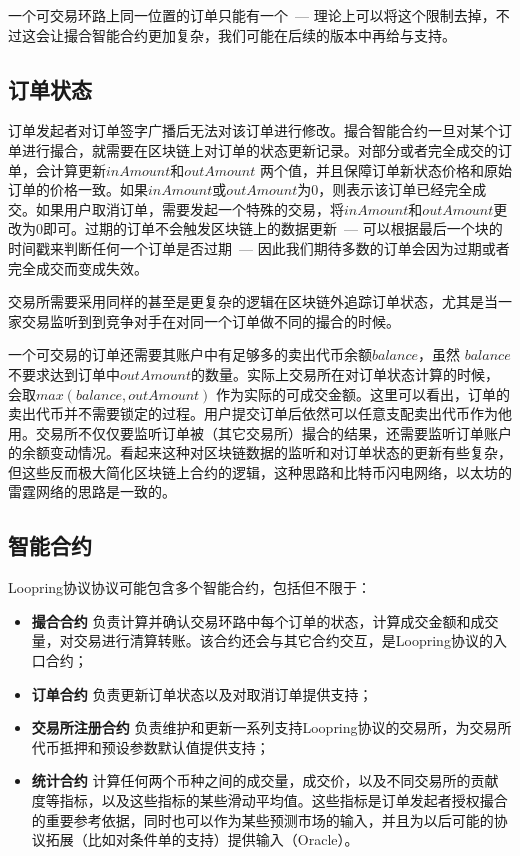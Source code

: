 \documentclass[UTF8,nofonts]{ctexart}
\begin{document}
一个可交易环路上同一位置的订单只能有一个\ --- 理论上可以将这个限制去掉，不过这会让撮合智能合约更加复杂，我们可能在后续的版本中再给与支持。

\subsection{订单状态\label{sec:orderstate}}

订单发起者对订单签字广播后无法对该订单进行修改。撮合智能合约一旦对某个订单进行撮合，就需要在区块链上对订单的状态更新记录。对部分或者完全成交的订单，会计算更新$inAmount$和$outAmount$ 两个值，并且保障订单新状态价格和原始订单的价格一致。如果$inAmount$或$outAmount$为0，则表示该订单已经完全成交。如果用户取消订单，需要发起一个特殊的交易，将$inAmount$和$outAmount$更改为0即可。过期的订单不会触发区块链上的数据更新\ --- 可以根据最后一个块的时间戳来判断任何一个订单是否过期\ --- 因此我们期待多数的订单会因为过期或者完全成交而变成失效。

交易所需要采用同样的甚至是更复杂的逻辑在区块链外追踪订单状态，尤其是当一家交易监听到到竞争对手在对同一个订单做不同的撮合的时候。


一个可交易的订单还需要其账户中有足够多的卖出代币余额$balance$，虽然 $balance$ 不要求达到订单中$outAmount$的数量。实际上交易所在对订单状态计算的时候，会取$max(balance, outAmount)$ 作为实际的可成交金额。这里可以看出，订单的卖出代币并不需要锁定的过程。用户提交订单后依然可以任意支配卖出代币作为他用。交易所不仅仅要监听订单被（其它交易所）撮合的结果，还需要监听订单账户的余额变动情况。看起来这种对区块链数据的监听和对订单状态的更新有些复杂，但这些反而极大简化区块链上合约的逻辑，这种思路和比特币闪电网络，以太坊的雷霆网络的思路是一致的。

\subsection{智能合约\label{sec:contracts}}

Loopring协议协议可能包含多个智能合约，包括但不限于：

\begin{itemize}
  \item  \textbf{撮合合约} 负责计算并确认交易环路中每个订单的状态，计算成交金额和成交量，对交易进行清算转账。该合约还会与其它合约交互，是Loopring协议的入口合约；
  \item   \textbf{订单合约} 负责更新订单状态以及对取消订单提供支持；
  \item  \textbf{交易所注册合约}  负责维护和更新一系列支持Loopring协议的交易所，为交易所代币抵押和预设参数默认值提供支持；
  \item \textbf{统计合约}  计算任何两个币种之间的成交量，成交价，以及不同交易所的贡献度等指标，以及这些指标的某些滑动平均值。这些指标是订单发起者授权撮合的重要参考依据，同时也可以作为某些预测市场的输入，并且为以后可能的协议拓展（比如对条件单的支持）提供输入（Oracle）。

\end{itemize}
\end{document}
